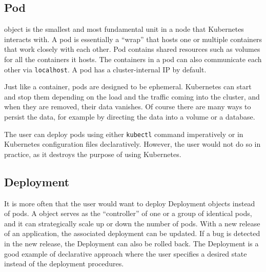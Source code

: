 \subsection{Pod}

 object is the smallest and most fundamental unit in a node that Kubernetes interacts with. A pod is essentially a ``wrap'' that hosts one or multiple containers that work closely with each other. Pod contains shared resources such as volumes for all the containers it hosts. The containers in a pod can also communicate each other via \verb|localhost|. A pod has a cluster-internal IP by default.

Just like a container, pods are designed to be ephemeral. Kubernetes can start and stop them depending on the load and the traffic coming into the cluster, and when they are removed, their data vanishes. Of course there are many ways to persist the data, for example by directing the data into a volume or a database.

The user can deploy pods using either \verb|kubectl| command imperatively or in Kubernetes configuration files declaratively. However, the user would not do so in practice, as it destroys the purpose of using Kubernetes.

\subsection{Deployment}

It is more often that the user would want to deploy Deployment objects instead of pods. A  object serves as the ``controller'' of one or a group of identical pods, and it can strategically scale up or down the number of pods. With a new release of an application, the associated deployment can be updated. If a bug is detected in the new release, the Deployment can also be rolled back. The Deployment is a good example of declarative approach where the user specifies a desired state instead of the deployment procedures.


